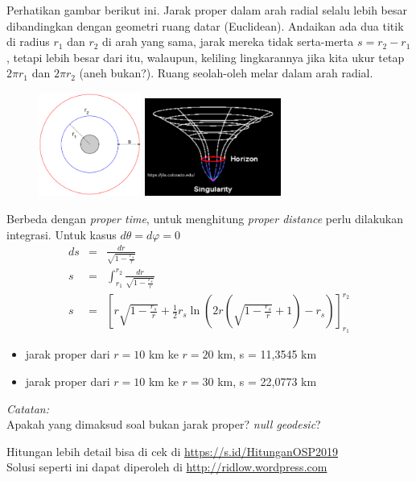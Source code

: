 \documentclass[11pt,fleqn]{exam}
\begin{document}
\begin{questions}
\begin{enumerate}[a.]
	Perhatikan gambar berikut ini. Jarak proper dalam arah radial selalu lebih besar dibandingkan dengan geometri ruang datar (Euclidean). Andaikan ada dua titik di radius $r_1$ dan $r_2$ di arah yang sama, jarak mereka tidak serta-merta $s = r_2 - r_1$, tetapi lebih besar dari itu, walaupun, keliling lingkarannya jika kita ukur tetap $2 \pi r_1$ dan $2 \pi r_2$ (aneh bukan?). Ruang seolah-oleh melar dalam arah radial. 
	\begin{figure}[H]
		\centering
		\includegraphics[width=0.3\textwidth]{schwarz.png}
		\includegraphics[width=0.4\textwidth]{blackhole.png}
	\end{figure}
	
	Berbeda dengan \textit{proper time}, untuk menghitung \textit{proper distance} perlu dilakukan integrasi. Untuk kasus $d\theta = d\varphi = 0$
	\begin{eqnarray*}
	ds &=& \frac{dr}{\sqrt{1 - \frac{r_s}{r}}}\\
	s &=& \int_{r_1}^{r_2} \frac{dr}{\sqrt{1 - \frac{r_s}{r}}}\\
	s &=& \left[ r \sqrt{1 - \frac{r_s}{r}} + \frac{1}{2} r_s \ln{\left( 2r \left( \sqrt{1 - \frac{r_s}{r}} + 1 \right) - r_s \right)} \right]_{r_1}^{r_2}
	\end{eqnarray*}

	\begin{itemize}
		\item jarak proper dari $r=10$ km ke $r=20$ km, s = 11,3545 km
		\item jarak proper dari $r=10$ km ke $r=30$ km, s = 22,0773 km
	\end{itemize}
	
	\vspace{0.5cm}
	\textit{Catatan:} \\
	Apakah yang dimaksud soal bukan jarak proper? \textit{null geodesic}?
	
	
\end{enumerate}




\end{questions}


\vspace{3cm}
\begin{flushright}
Hitungan lebih detail bisa di cek di \url{https://s.id/HitunganOSP2019}\\
Solusi seperti ini dapat diperoleh di \url{http://ridlow.wordpress.com}
\end{flushright}
\end{document}
